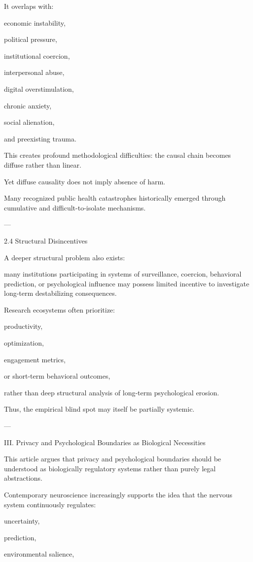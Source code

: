 It overlaps with:

economic instability,

political pressure,

institutional coercion,

interpersonal abuse,

digital overstimulation,

chronic anxiety,

social alienation,

and preexisting trauma.


This creates profound methodological difficulties: the causal chain becomes diffuse rather than linear.

Yet diffuse causality does not imply absence of harm.

Many recognized public health catastrophes historically emerged through cumulative and difficult-to-isolate mechanisms.


---

2.4 Structural Disincentives

A deeper structural problem also exists:

many institutions participating in systems of surveillance, coercion, behavioral prediction, or psychological influence may possess limited incentive to investigate long-term destabilizing consequences.

Research ecosystems often prioritize:

productivity,

optimization,

engagement metrics,

or short-term behavioral outcomes,


rather than deep structural analysis of long-term psychological erosion.

Thus, the empirical blind spot may itself be partially systemic.


---

III. Privacy and Psychological Boundaries as Biological Necessities

This article argues that privacy and psychological boundaries should be understood as biologically regulatory systems rather than purely legal abstractions.

Contemporary neuroscience increasingly supports the idea that the nervous system continuously regulates:

uncertainty,

prediction,

environmental salience,

